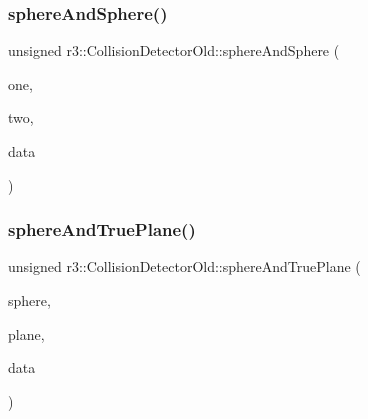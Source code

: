 \mbox{\label{classr3_1_1_collision_detector_old_a947191d7a2503e4475d3a9098009601e}} 
\subsubsection{\texorpdfstring{sphere\+And\+Sphere()}{sphereAndSphere()}}
{\footnotesize\ttfamily unsigned r3\+::\+Collision\+Detector\+Old\+::sphere\+And\+Sphere (\begin{DoxyParamCaption}\item[{const \mbox{\hyperlink{classr3_1_1_collision_sphere}{Collision\+Sphere}} \&}]{one,  }\item[{const \mbox{\hyperlink{classr3_1_1_collision_sphere}{Collision\+Sphere}} \&}]{two,  }\item[{\mbox{\hyperlink{classr3_1_1_collision_data_old}{Collision\+Data\+Old}} $\ast$}]{data }\end{DoxyParamCaption})\hspace{0.3cm}{\ttfamily [static]}}

\mbox{\label{classr3_1_1_collision_detector_old_ac193fb110bfd2618ed61aa59b72c6877}} 
\subsubsection{\texorpdfstring{sphere\+And\+True\+Plane()}{sphereAndTruePlane()}}
{\footnotesize\ttfamily unsigned r3\+::\+Collision\+Detector\+Old\+::sphere\+And\+True\+Plane (\begin{DoxyParamCaption}\item[{const \mbox{\hyperlink{classr3_1_1_collision_sphere}{Collision\+Sphere}} \&}]{sphere,  }\item[{const \mbox{\hyperlink{classr3_1_1_collision_plane}{Collision\+Plane}} \&}]{plane,  }\item[{\mbox{\hyperlink{classr3_1_1_collision_data_old}{Collision\+Data\+Old}} $\ast$}]{data }\end{DoxyParamCaption})\hspace{0.3cm}{\ttfamily [static]}}



